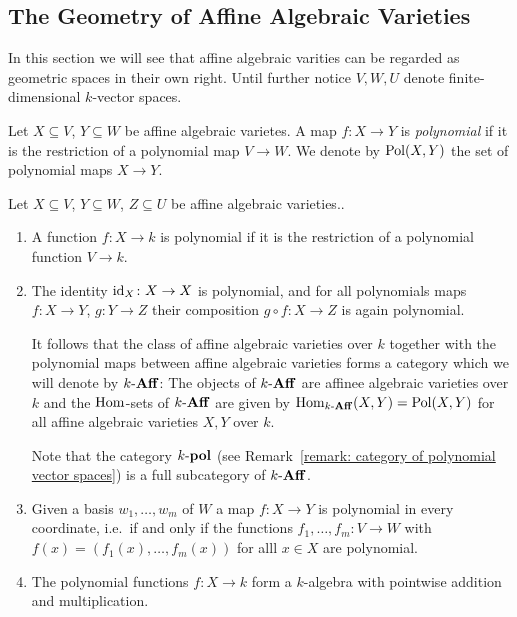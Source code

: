 \subsection{The Geometry of Affine Algebraic Varieties}
\label{subsection: geometry of affine algebraic varietes}


\begin{fluff}
  In this section we will see that affine algebraic varities can be regarded as geometric spaces in their own right.
  Until further notice $V, W, U$ denote finite-dimensional $k$-vector spaces.
\end{fluff}


\begin{definition}
  Let $X \subseteq V$, $Y \subseteq W$ be affine algebraic varietes.
  A map $f \colon X \to Y$ is \emph{polynomial} if it is the restriction of a polynomial map $V \to W$.
  We denote by $\operatorname{Pol}(X,Y)$ the set of polynomial maps $X \to Y$.
\end{definition}


\begin{remark}
  Let $X \subseteq V$, $Y \subseteq W$, $Z \subseteq U$ be affine algebraic varieties..
  \begin{enumerate}
    \item
      A function $f \colon X \to k$ is polynomial if it is the restriction of a polynomial function $V \to k$.
    \item
      The identity $\operatorname{id}_X \colon X \to X$ is polynomial, and for all polynomials maps $f \colon X \to Y$, $g \colon Y \to Z$ their composition $g \circ f \colon X \to Z$ is again polynomial.
      
      It follows that the class of affine algebraic varieties over $k$ together with the polynomial maps between affine algebraic varieties forms a category which we will denote by $k\text{-}\mathbf{Aff}$:
      The objects of $k\text{-}\mathbf{Aff}$ are affinee algebraic varieties over $k$ and the $\operatorname{Hom}$-sets of $k\text{-}\mathbf{Aff}$ are given by $\operatorname{Hom}_{k\text{-}\mathbf{Aff}}(X,Y) = \operatorname{Pol}(X,Y)$ for all affine algebraic varieties $X, Y$ over $k$.
      
      Note that the category $k\text{-}\mathbf{pol}$ (see Remark~\ref{remark: category of polynomial vector spaces}) is a full subcategory of $k\text{-}\mathbf{Aff}$.
    \item
      Given a basis $w_1, \dotsc, w_m$ of $W$ a map $f \colon X \to Y$ is polynomial in every coordinate, i.e.\ if and only if the functions $f_1, \dotsc, f_m \colon V \to W$ with $f(x) = (f_1(x), \dotsc, f_m(x))$ for alll $x \in X$ are polynomial.
    \item
      The polynomial functions $f \colon X \to k$ form a $k$-algebra with pointwise addition and multiplication.
  \end{enumerate}
\end{remark}


